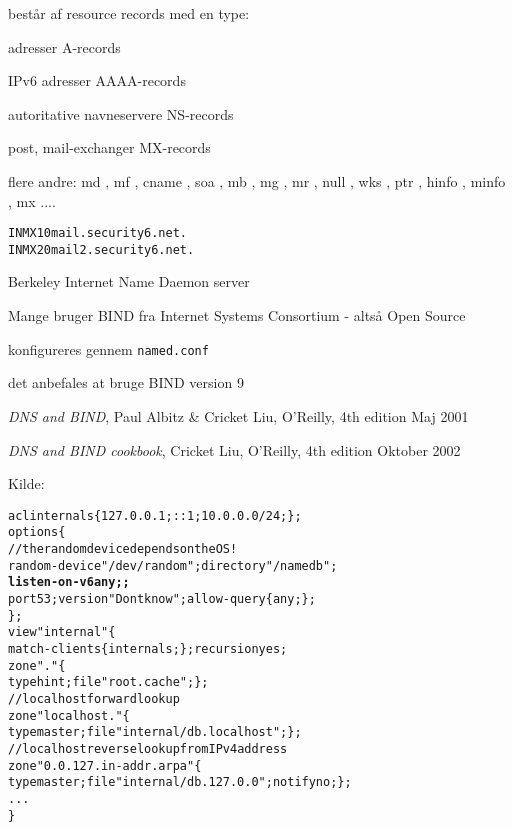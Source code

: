 \documentclass[Screen16to9,17pt]{foils}
\begin{document}
\begin{list1}
  \item består af resource records med en type:
    \begin{list2}
\item adresser A-records
\item IPv6 adresser AAAA-records
\item autoritative navneservere NS-records
\item post, mail-exchanger MX-records
\item flere andre: md ,  mf ,  cname ,  soa ,
                  mb , mg ,  mr ,  null ,  wks ,  ptr ,
                  hinfo ,  minfo ,  mx ....
\end{list2}
\end{list1}
\begin{alltt}
        IN      MX      10      mail.security6.net.
        IN      MX      20      mail2.security6.net.
\end{alltt}








\begin{list1}
\item Berkeley Internet Name Daemon server
\item Mange bruger BIND fra Internet Systems Consortium
   - altså Open Source
\item konfigureres gennem \verb+named.conf+
\item det anbefales at bruge BIND version 9
\end{list1}

\begin{list2}
\item \emph{DNS and BIND}, Paul Albitz \& Cricket Liu, O'Reilly, 4th
  edition Maj 2001
\item \emph{DNS and BIND cookbook}, Cricket Liu, O'Reilly, 4th
  edition Oktober 2002
\end{list2}

Kilde: 


\begin{alltt}
\small
acl internals \{ 127.0.0.1; ::1; 10.0.0.0/24; \};
options \{
        // the random device depends on the OS !
        random-device "/dev/random"; directory "/namedb";
        {\bf listen-on-v6 { any; };}
        port 53; version "Dont know"; allow-query \{ any; \};
\};
view "internal" \{
   match-clients \{ internals; \}; recursion yes;
   zone "." \{
       type hint;   file "root.cache"; \};
   // localhost forward lookup
   zone "localhost." \{
        type master; file "internal/db.localhost";   \};
   // localhost reverse lookup from IPv4 address
   zone "0.0.127.in-addr.arpa" \{
        type master; file "internal/db.127.0.0"; notify no;   \};
...
\}
\end{alltt}
\end{document}
